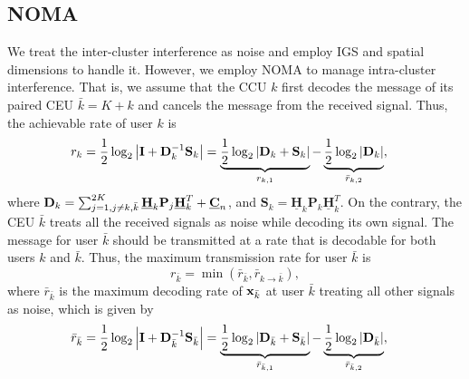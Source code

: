\documentclass[a4, conference]{IEEEtran}
\theoremstyle{definition}
\begin{document}
\subsection{NOMA}
We treat the inter-cluster interference as noise and employ IGS and spatial dimensions to handle it. However, we employ NOMA to manage intra-cluster interference.
That is, we assume that the CCU $k$ first decodes the message of its paired CEU $\bar{k}=K+k$ and cancels the message from the received signal. Thus, the achievable rate of user $k$ is  
\begin{align}%
{r}_{{k}}&=\frac{1}{2}\log_2\left|{\bf I}+
{\bf D}^{-1}_{{k}}
{\bf S}_{{k}}
 \right|
=
\underbrace{
\frac{1}{2}\log_2\left|{\bf D}_{{k}}
+
{\bf S}_{{k}}
\right|
}_{{r}_{{k},1}}
-
\underbrace{
\frac{1}{2}\log_2\left|{\bf D}_{{k}}%
\right|
}_{\bar{r}_{{k},2}},
\end{align}
where $\mathbf{D}_{k}%
=
\sum_{j= 1,j\neq k,\bar{k}}^{2K}
\underline{\mathbf{H}}_{k}%
\mathbf{P}_{j}
\underline{\mathbf{H}}_{k}^T%
+
\underline{\bf C}_n
$, and $\mathbf{S}_{k}=\underline{\mathbf{H}}_{k}%
\mathbf{P}_{k}
\underline{\mathbf{H}}_{k}^T$.
On the contrary, the CEU $\bar{k}$ treats all the received signals as noise while decoding its own signal. The message for user $\bar{k}$ should be transmitted at a rate that is decodable for both users $k$ and $\bar{k}$.
Thus, the maximum transmission rate for user $\bar{k}$ is %
\begin{equation}\label{eq-12}
r_{\bar{k}}=\min\left(\bar{r}_{\bar{k}},\bar{r}_{k\rightarrow\bar{k}}\right),
\end{equation}
where $\bar{r}_{\bar{k}}$ is the maximum decoding rate of ${\bf x}_{\bar{k}}$ at  user ${\bar{k}}$ treating all other signals as noise, which is given by %
\begin{align}%
\bar{r}_{\bar{k}}&=\frac{1}{2}\log_2\left|{\bf I}+
{\bf D}^{-1}_{\bar{k}}
{\bf S}_{\bar{k}}
 \right|
=
\underbrace{
\frac{1}{2}\log_2\left|{\bf D}_{\bar{k}}
+
{\bf S}_{\bar{k}}
\right|
}_{\bar{r}_{\bar{k},1}}
-
\underbrace{
\frac{1}{2}\log_2\left|{\bf D}_{\bar{k}}%
\right|
}_{\bar{r}_{\bar{k},2}},
\label{eq-22-2}
\end{align}
\end{document}

